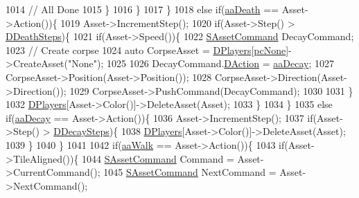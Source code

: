 \begin{DoxyCode}
{{1014                     \textcolor{comment}{// All Done    }
1015                 \}
1016             \}   
1017         \}
1018         \textcolor{keywordflow}{else} \textcolor{keywordflow}{if}(\hyperlink{GameDataTypes_8h_ab47668e651a3032cfb9c40ea2d60d670a917cb474275eadda79115015ef00d5df}{aaDeath} == Asset->Action())\{
1019             Asset->IncrementStep();
1020             \textcolor{keywordflow}{if}(Asset->Step() > \hyperlink{classCGameModel_a8067a8f3737b0f1d6fced523926ce167}{DDeathSteps})\{
1021                 \textcolor{keywordflow}{if}(Asset->Speed())\{
1022                     \hyperlink{structSAssetCommand}{SAssetCommand} DecayCommand;
1023                     \textcolor{comment}{// Create corpse}
1024                     \textcolor{keyword}{auto} CorpseAsset = \hyperlink{classCGameModel_a524436c3560b10e1c6d6fdd0b66565dc}{DPlayers}[\hyperlink{GameDataTypes_8h_aafb0ca75933357ff28a6d7efbdd7602fa88767aa8e02c7b3192bbab4127b3d729}{pcNone}]->CreateAsset(\textcolor{stringliteral}{"None"});
1025                     
1026                     DecayCommand.\hyperlink{structSAssetCommand_a8edd3b3d59a76d5514ba403bc8076a75}{DAction} = \hyperlink{GameDataTypes_8h_ab47668e651a3032cfb9c40ea2d60d670a5529d58a84a26b10744433d7bf171451}{aaDecay};
1027                     CorpseAsset->Position(Asset->Position());
1028                     CorpseAsset->Direction(Asset->Direction());
1029                     CorpseAsset->PushCommand(DecayCommand);
1030                     
1031                 \}
1032                 \hyperlink{classCGameModel_a524436c3560b10e1c6d6fdd0b66565dc}{DPlayers}[Asset->Color()]->DeleteAsset(Asset);
1033             \}
1034         \}
1035         \textcolor{keywordflow}{else} \textcolor{keywordflow}{if}(\hyperlink{GameDataTypes_8h_ab47668e651a3032cfb9c40ea2d60d670a5529d58a84a26b10744433d7bf171451}{aaDecay} == Asset->Action())\{
1036             Asset->IncrementStep();
1037             \textcolor{keywordflow}{if}(Asset->Step() > \hyperlink{classCGameModel_ac4a0ea3659c796b1c4f8b1f91d0e3258}{DDecaySteps})\{
1038                 \hyperlink{classCGameModel_a524436c3560b10e1c6d6fdd0b66565dc}{DPlayers}[Asset->Color()]->DeleteAsset(Asset);
1039             \}
1040         \}
1041         
1042         \textcolor{keywordflow}{if}(\hyperlink{GameDataTypes_8h_ab47668e651a3032cfb9c40ea2d60d670a60ca9010aa62b73c1aab838ff4bf7276}{aaWalk} == Asset->Action())\{
1043             \textcolor{keywordflow}{if}(Asset->TileAligned())\{
1044                 \hyperlink{structSAssetCommand}{SAssetCommand} Command = Asset->CurrentCommand();
1045                 \hyperlink{structSAssetCommand}{SAssetCommand} NextCommand = Asset->NextCommand();
}}
\end{DoxyCode}
